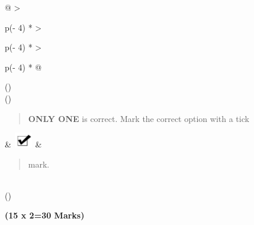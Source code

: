 \documentclass[
]{article}
\begin{document}
\begin{longtable}[]{@{}
  >{\raggedright\arraybackslash}p{(\columnwidth - 4\tabcolsep) * }
  >{\raggedright\arraybackslash}p{(\columnwidth - 4\tabcolsep) * }
  >{\raggedright\arraybackslash}p{(\columnwidth - 4\tabcolsep) * }@{}}
\toprule()
 \\
\midrule()
\endhead
\begin{minipage}[t]{\linewidth}\raggedright
\begin{quote}
\textbf{ONLY ONE} is correct. Mark the correct option with a tick
\end{quote}
\end{minipage} &
\includegraphics[width=0.32639in,height=0.25833in]{vertopal_2361032064654423b71b7db67d98c753/media/image1.png}
& \begin{minipage}[t]{\linewidth}\raggedright
\begin{quote}
mark.
\end{quote}
\end{minipage} \\
\bottomrule()
\end{longtable}

\textbf{(15 x 2=30 Marks)}
\end{document}
